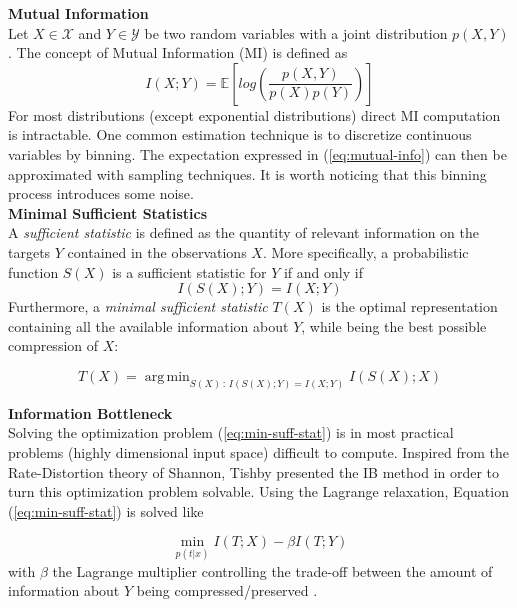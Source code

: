 \documentclass[twocolumn,superscriptaddress,aps]{revtex4-1}
\DeclareMathOperator*{\argmin}{arg\,min}
\begin{document}
\noindent \textbf{Mutual Information} \\[0.15cm]
\indent Let $X \in \mathcal{X}$ and $Y \in \mathcal{Y}$ be two random variables with a joint distribution $p(X,Y)$. The concept of Mutual Information (MI) is defined as
\begin{equation}
I(X;Y) = \mathbb{E} \left[log\left(\frac{p(X,Y)}{p(X)p(Y)} \right)\right]
\label{eq:mutual-info}
\end{equation}
For most distributions (except exponential distributions) direct MI computation is intractable. One common estimation technique is to discretize continuous variables by binning. The expectation expressed in (\ref{eq:mutual-info}) can then be approximated with sampling techniques. It is worth noticing that this binning process introduces some noise.\\

\noindent \textbf{Minimal Sufficient Statistics} \\[0.15cm]
\indent A \textit{sufficient statistic} is defined as the quantity of relevant information on the targets $Y$ contained in the observations $X$. More specifically, a probabilistic function $S(X)$ is a sufficient statistic for $Y$ if and only if
\begin{equation}
I(S(X);Y) = I(X;Y)
\label{eq:suff-stat}
\end{equation}
Furthermore, a \textit{minimal sufficient statistic} $T(X)$ is the optimal representation containing all the available information about $Y$, while being the best possible compression of $X$:

\begin{equation}
T(X) = \argmin_{S(X) \, : \, I(S(X);Y) = I(X;Y)} I(S(X);X)
\label{eq:min-suff-stat}
\end{equation}

\noindent \textbf{Information Bottleneck} \\[0.15cm]
\indent Solving the optimization problem (\ref{eq:min-suff-stat}) is in most practical problems (highly dimensional input space) difficult to compute. Inspired from the Rate-Distortion theory of Shannon, Tishby presented the IB method \citep{Tishby1} in order to turn this optimization problem solvable. Using the Lagrange relaxation, Equation (\ref{eq:min-suff-stat}) is solved like

\begin{equation}
\min_{p(t|x)} I(T;X) - \beta I(T;Y)
\label{eq:lagrange}
\end{equation}
with $\beta$ the Lagrange multiplier controlling the trade-off between the amount of information about $Y$ being compressed/preserved .
\end{document}
